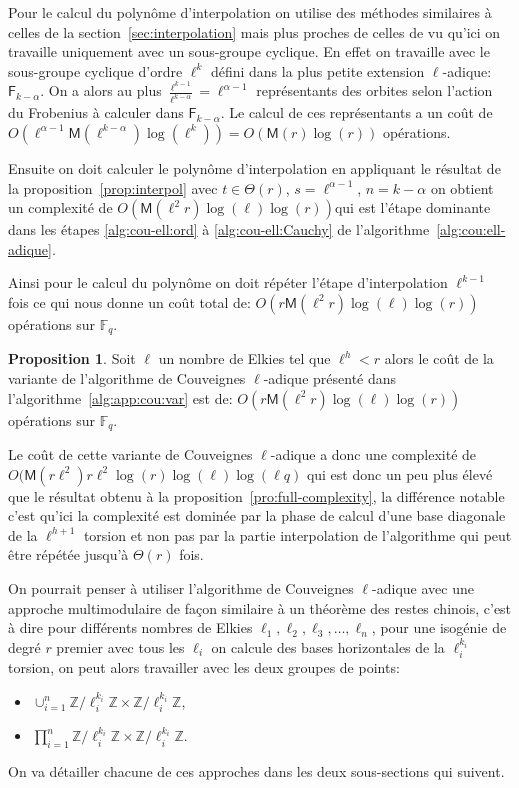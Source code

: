 \documentclass[10pt,a4paper]{book}
\theoremstyle{plain}
\theoremstyle{definition}
\theoremstyle{definition}
\theoremstyle{definition}
\newtheorem{prop}[thm]{Proposition}
\theoremstyle{definition}
\theoremstyle{remark}
\theoremstyle{remark}
\theoremstyle{definition}
\begin{document}
Pour le calcul du polynôme d'interpolation on utilise des méthodes 
similaires à celles de la section~\ref{sec:interpolation} mais plus proches de 
celles de \cite[§5]{DeFeo11} vu qu'ici on travaille uniquement avec un sous-groupe 
cyclique. En effet on travaille avec le sous-groupe cyclique d'ordre $\ell^k$ 
défini dans la plus petite extension $\ell$-adique: $\mathsf{F}_{k-\alpha}$. 
On a alors au plus $\frac{\ell^{k-1}}{\ell^{k-\alpha}}=\ell^{\alpha-1}$ représentants 
des orbites selon l'action du Frobenius à calculer dans $\mathsf{F}_{k-\alpha}$.
Le calcul de ces représentants a un coût de 
$O(\ell^{\alpha-1}\mathsf{M}(\ell^{k-\alpha})\log(\ell^k))=O(\mathsf{M}(r)\log(r))$ opérations.

Ensuite on doit calculer le polynôme d'interpolation en appliquant le résultat
 de la proposition~\ref{prop:interpol} avec $t \in \Theta(r)$, $s=\ell^{\alpha-1}$, 
 $n=k-\alpha$ on obtient un complexité de 
 $O(\mathsf{M}(\ell^2r)\log(\ell)\log(r))$qui est l'étape dominante dans les
 étapes \ref{alg:cou-ell:ord} à \ref{alg:cou-ell:Cauchy} de 
 l'algorithme~\ref{alg:cou:ell-adique}.

Ainsi pour le calcul du polynôme on doit répéter l'étape d'interpolation 
$\ell^{k-1}$ fois ce qui nous donne un coût total de: 
$O(r\mathsf{M}(\ell^2r)\log(\ell)\log(r))$ opérations sur $\mathbb{F}_q$.

\begin{prop}
Soit $\ell$ un nombre de Elkies tel que $\ell^h<r$ alors le coût de la 
variante de l'algorithme de Couveignes $\ell$-adique présenté dans 
l'algorithme~\ref{alg:app:cou:var} 
est de: 
$O(r\mathsf{M}(\ell^2r)\log(\ell)\log(r))$ opérations sur $\mathbb{F}_q$.
\end{prop}

Le coût de cette variante de Couveignes $\ell$-adique a donc une complexité de
$O(\mathsf{M}(r\ell^2)r\ell^2 \log(r) \log(\ell) \log(\ell q)$ qui est donc un 
peu plus élevé que le résultat obtenu à la 
proposition~\ref{pro:full-complexity}, la différence notable c'est qu'ici la 
complexité est dominée par la phase de calcul d'une base diagonale de la 
$\ell^{h+1}$ torsion et non pas par la partie interpolation de l'algorithme qui
peut être répétée jusqu'à $\Theta(r)$ fois.


On pourrait penser à utiliser l'algorithme de Couveignes $\ell$-adique avec une
approche multimodulaire de façon similaire à un théorème des restes chinois, 
c'est à dire pour différents nombres de Elkies $\ell_1, \ell_2, \ell_3, \dots, 
\ell_{n}$, pour une isogénie de degré $r$ premier avec tous les $\ell_i$ on 
calcule des bases horizontales de la $\ell_i^{k_i}$ torsion, on peut alors 
travailler avec les deux groupes de points:
\begin{itemize}
\item $\cup_{i=1}^n \mathbb{Z}/\ell_i^{k_i} \mathbb{Z} \times \mathbb{Z}/\ell_i^{k_i} \mathbb{Z}$, 
\item $\prod_{i=1}^n \mathbb{Z}/\ell_i^{k_i} \mathbb{Z} \times \mathbb{Z}/\ell_i^{k_i} \mathbb{Z} $.
\end{itemize}
On va détailler chacune de ces approches dans les deux sous-sections qui suivent.
\end{document}
